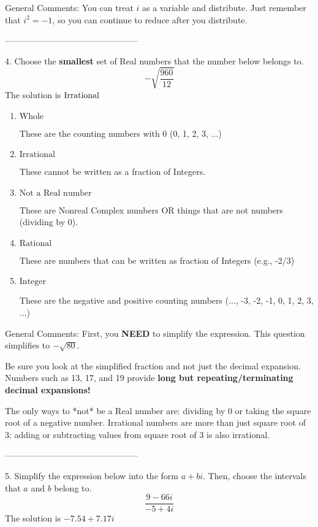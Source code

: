\documentclass{extbook}[14pt]
\begin{document}
General Comments: You can treat $i$ as a variable and distribute. Just remember that $i^2=-1$, so you can continue to reduce after you distribute.

-----------------------------------------------

4. Choose the \textbf{smallest} set of Real numbers that the number below belongs to.
\[ -\sqrt{\frac{960}{12}} \] 
The solution is $ \text{\text{Irrational}} $ 

\begin{enumerate}[label=\Alph*.] 
\item $ \text{Whole} $ 

 These are the counting numbers with 0 (0, 1, 2, 3, ...) 
\item $ \text{Irrational} $ 

 These cannot be written as a fraction of Integers. 
\item $ \text{Not a Real number} $ 

 These are Nonreal Complex numbers OR things that are not numbers (dividing by 0). 
\item $ \text{Rational} $ 

 These are numbers that can be written as fraction of Integers (e.g., -2/3) 
\item $ \text{Integer} $ 

 These are the negative and positive counting numbers (..., -3, -2, -1, 0, 1, 2, 3, ...) 
\end{enumerate} 
 
General Comments: First, you \textbf{NEED} to simplify the expression. This question simplifies to $-\sqrt{80}$. 
 
 Be sure you look at the simplified fraction and not just the decimal expansion. Numbers such as 13, 17, and 19 provide \textbf{long but repeating/terminating decimal expansions!} 
 
 The only ways to *not* be a Real number are: dividing by 0 or taking the square root of a negative number. Irrational numbers are more than just square root of 3: adding or subtracting values from square root of 3 is also irrational.

-----------------------------------------------

5. Simplify the expression below into the form $a+bi$. Then, choose the intervals that $a$ and $b$ belong to.
\[ \frac{9  - 66 i}{-5  + 4 i} \] 
The solution is $ -7.54  + 7.17 i $ 
\end{document}
